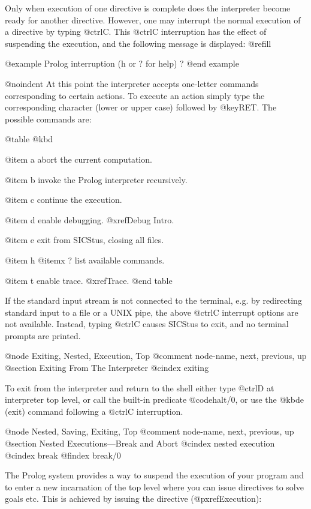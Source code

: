 Only when execution of one directive is complete does the interpreter
become ready for another directive.  However, one may interrupt the normal
execution of a directive by typing @ctrl{C}.  This @ctrl{C} interruption
has the effect of suspending the execution, and the following message is
displayed: @refill

@example
Prolog interruption (h or ? for help) ?
@end example

@noindent
At this point the interpreter accepts one-letter commands corresponding to
certain actions.  To execute an action simply type the corresponding
character (lower or upper case) followed by @key{RET}.  The possible commands
are:

@table @kbd

@item a
abort the current computation.

@item b
invoke the Prolog interpreter recursively.

@item c
continue the execution.

@item d
enable debugging. @xref{Debug Intro}.

@item e
exit from SICStus, closing all files.

@item h
@itemx ?
list available commands.

@item t
enable trace. @xref{Trace}.
@end table

If the standard input stream is not connected to the terminal, e.g. by
redirecting standard input to a file or a UNIX pipe, the above @ctrl{C}
interrupt options are not available.  Instead, typing @ctrl{C} causes
SICStus to exit, and no terminal prompts are printed.


@node Exiting, Nested, Execution, Top
@comment  node-name,  next,  previous,  up
@section Exiting From The Interpreter
@cindex exiting

To exit from the interpreter and return to the shell either type
@ctrl{D} at interpreter top level, or call the built-in predicate
@code{halt/0}, or use the @kbd{e} (exit) command following a @ctrl{C}
interruption.

@node Nested, Saving, Exiting, Top
@comment  node-name,  next,  previous,  up
@section Nested Executions---Break and Abort
@cindex nested execution
@cindex break
@findex break/0

The Prolog system provides a way to suspend the execution of your program
and to enter a new incarnation of the top level where you can issue
directives to solve goals etc.  This is achieved by issuing the directive
(@pxref{Execution}):

